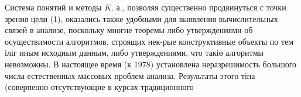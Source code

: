\documentclass[10pt]{article}
\begin{document}
Система понятий и методы $K$. а., позволяя существенно продвинуться с точки зрения цели (1), оказались также удобными для выявления вычислительных связеӥ в анализе, поскольку многие теоремы либо утверждениями об осуществимости алгоритмов, строящих нек-рые конструктивные объекты по тем іліг иным исходным данным, либо утверждениями, что такіө алгоритмы невозможны. В настоящее время (к 1978) установлена неразрешимость большого числа естественных массовых проблем анализа. Результаты этого тіпа (соверпенно отсутствующие в курсах традиционного
\end{document}
